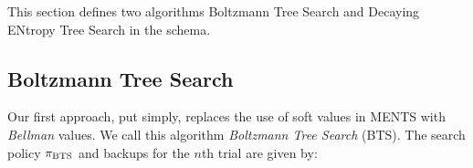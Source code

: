 





    This section defines two algorithms Boltzmann Tree Search and Decaying ENtropy Tree Search in the \thtspp\ewe schema. 
    
    \subsection{Boltzmann Tree Search}
    \label{sec:4-2-1-bts}




        Our first approach, put simply, replaces the use of soft values in MENTS with 
        \textit{Bellman} 
        values. We call this algorithm \textit{Boltzmann Tree Search} (BTS).  The search policy $\pi_{\textnormal{BTS}}$ and backups for the $n$th trial are given by:


